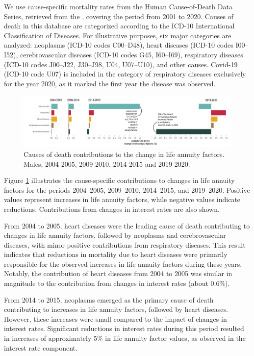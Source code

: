 \documentclass[12pt]{article}
\begin{document}
{We use cause-specific mortality rates from the Human Cause-of-Death Data Series, retrieved from the \citet{HCD2024}, covering the period from 2001 to 2020. Causes of death in this database are categorized according to the ICD-10 International Classification of Diseases. For illustrative purposes, six major categories are analyzed: neoplasms (ICD-10 codes C00–D48), heart diseases (ICD-10 codes I00–I52), cerebrovascular diseases (ICD-10 codes G45, I60–I69), respiratory diseases (ICD-10 codes J00–J22, J30–J98, U04, U07–U10), and other causes. Covid-19 (ICD-10 code U07) is included in the category of respiratory diseases exclusively for the year 2020, as it marked the first year the disease was observed.

\begin{figure}[H]
	\centering
	\includegraphics[width=1\linewidth]{Fig/attributionCauseOfDeathInLine}
	\caption{{Causes of death contributions to the change in life annuity factors. Males, 2004-2005, 2009-2010, 2014-2015 and 2019-2020.}}
	\label{fig:Fig7}
\end{figure}

Figure \ref{fig:Fig7} illustrates the cause-specific contributions to changes in life annuity factors for the periods 2004–2005, 2009–2010, 2014–2015, and 2019–2020. Positive values represent increases in life annuity factors, while negative values indicate reductions. Contributions from changes in interest rates are also shown.

From 2004 to 2005, heart diseases were the leading cause of death contributing to changes in life annuity factors, followed by neoplasms and cerebrovascular diseases, with minor positive contributions from respiratory diseases. This result indicates that reductions in mortality due to heart diseases were primarily responsible for the observed increases in life annuity factors during these years. Notably, the contribution of heart diseases from 2004 to 2005 was similar in magnitude to the contribution from changes in interest rates (about 0.6\%).

From 2014 to 2015, neoplasms emerged as the primary cause of death contributing to increases in life annuity factors, followed by heart diseases. However, these increases were small compared to the impact of changes in interest rates. Significant reductions in interest rates during this period resulted in increases of approximately 5\% in life annuity factor values, as observed in the interest rate component.

}
\end{document}
